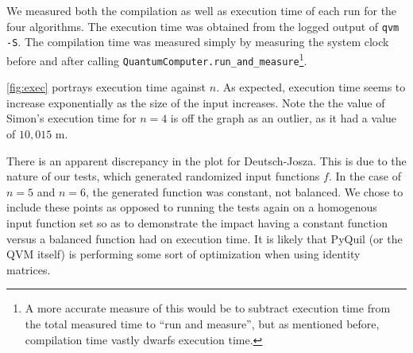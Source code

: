 \documentclass[12pt]{article}
\begin{document}
We measured both the compilation as well as execution time of each run for the four algorithms.
The execution time was obtained from the logged output of \texttt{qvm -S}.
The compilation time was measured simply by measuring the system clock before and after calling \texttt{QuantumComputer.run\_and\_measure}\footnote{A more accurate measure of this would be to subtract execution time from the total measured time to ``run and measure'', but as mentioned before, compilation time vastly dwarfs execution time.}.


\autoref{fig:exec} portrays execution time against $n$.
As expected, execution time seems to increase exponentially as the size of the input increases.
Note the the value of Simon's execution time for $n=4$ is off the graph as an outlier, as it had a value of $10,015$ m.

There is an apparent discrepancy in the plot for Deutsch-Josza.
This is due to the nature of our tests, which generated randomized input functions $f$.
In the case of $n=5$ and $n=6$, the generated function was constant, not balanced.
We chose to include these points as opposed to running the tests again on a homogenous input function set so as to demonstrate the impact having a constant function versus a balanced function had on execution time.
It is likely that PyQuil (or the QVM itself) is performing some sort of optimization when using identity matrices.
\end{document}
